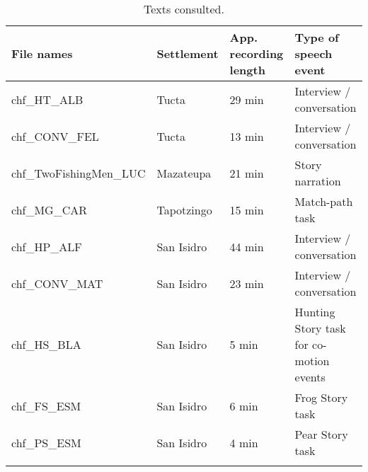 \documentclass[output=paper
,modfonts
,nonflat]{langsci/langscibook}
\begin{document}
\begin{table}[H]
	\caption{Texts consulted.}
	\label{tab:pico:7}
	\small
	\begin{tabularx}{\textwidth}{lXXX}
	\lsptoprule
	File names                                                                             & Settlement & App. recording length & Type of speech event                    \\ 
	\midrule
	chf\_HT\_ALB                      & Tucta      & 29 min                                                                 & Interview / conversation             \\ 
	chf\_CONV\_FEL                          & Tucta      & 13 min                                                                 & Interview / conversation                \\ 
	chf\_TwoFishingMen\_LUC                                                                    & Mazateupa  & 21 min                                                                 & Story narration                                                                   \\ 
	chf\_MG\_CAR                                 & Tapotzingo & 15 min                                                                 & Match-path task                                                                   \\ 
	chf\_HP\_ALF                         & San Isidro & 44 min                                                                 & Interview / conversation                \\ 
	chf\_CONV\_MAT                      & San Isidro & 23 min                                                                 & Interview / conversation                \\ 
	chf\_HS\_BLA                                                                               & San Isidro & 5 min                                                                  & Hunting Story task for co-motion events \\ 
	chf\_FS\_ESM                  & San Isidro & 6 min                                                                  & Frog Story task                                                                   \\ 
	chf\_PS\_ESM             & San Isidro & 4 min                                                                  & Pear Story task        \\                                                            
	\lspbottomrule
	\end{tabularx}%
\end{table}
\end{document}
